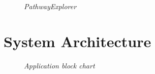 \begin{figure}[ht]
\centering
{} 
\caption[PathwayExplorer]{\textit{PathwayExplorer}} 
\label{gfx:pathway_explorer}
\end{figure}


\chapter{System Architecture}

\begin{figure}[ht]
\centering
{} 
\caption[Application block chart]{\textit{Application block chart}} 
\label{gfx:application_block_chart}
\end{figure}

